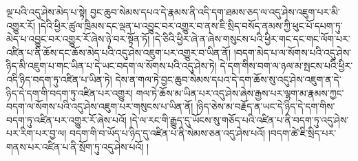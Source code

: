 ལྔ་པའི་འདུ་ཤེས་མེད་པ་སྟེ། བྱང་ཆུབ་སེམས་དཔའ་དེ་རྣམས་ནི་འདི་དག་ཐམས་ཅད་ལ་འདུ་ཤེས་འཇུག་པར་མི་འགྱུར་རོ། །དེའི་ཕྱིར་ཚུལ་ཁྲིམས་དང་ལྡན་པ་འབྱུང་བར་འགྱུར་བ་ནས་ཇི་སྲིད་བསོད་ནམས་ཀྱི་ཕུང་པོ་དཔག་ཏུ་མེད་པ་འབྱུང་བར་འགྱུར་རོ་ཞེས་ཉེ་བར་སྟོན་ཏོ། །དེ་ཅིའི་ཕྱིར་ཞེ་ན་ཞེས་གསུངས་པའི་ཕྱིར་གང་དང་གང་ལོག་པར་འཛིན་པ་ནི་ཆོས་དང་ཆོས་མེད་པའི་འདུ་ཤེས་འཇུག་པར་འགྱུར་བ་ཡིན་ནོ། །བདག་མེད་པ་ལ་སོགས་པའི་འདུ་ཤེས་ཉིད་མི་འཇུག་པ་གང་ཡིན་པ་དེ་ཡང་བདག་ལ་སོགས་པའི་འདུ་ཤེས་ཏེ། དེ་དག་གིས་བག་ལ་ཉལ་མ་སྤངས་པའི་ཕྱིར་འདི་ཉིད་བདག་ཏུ་འཛིན་པ་ཡིན་ཏེ། དེས་ན་གལ་ཏེ་བྱང་ཆུབ་སེམས་དཔའ་དེ་དག་ཆོས་སུ་འདུ་ཤེས་འཇུག་ན་དེ་ཉིད་དེ་དག་གི་བདག་ཏུ་འཛིན་པར་འགྱུར། གལ་ཏེ་ཆོས་མ་ཡིན་པར་འདུ་ཤེས་ཞེས་རྒྱས་པར་ལྷག་མ་རྣམས་ཀྱང་བདག་ལ་སོགས་པའི་འདུ་ཤེས་འཇུག་པར་གསུངས་པ་ཡིན་ནོ། །ཉིད་ཅེས་མ་བརྗོད་ན་ཡང་དེ་ཉིད་དེ་དག་གིས་བདག་ཏུ་འཛིན་པར་འགྱུར་རོ་ཞེས་པའོ། །དེ་ལ་རང་གི་རྒྱུད་དུ་ཡོངས་སུ་གཅོད་པའི་འཛིན་པ་ནི་བདག་ཏུ་འདུ་ཤེས་པར་རིག་པར་བྱ་ལ། བདག་གི་བ་ཡོད་པ་ཉིད་དུ་འཛིན་པ་ནི་སེམས་ཅན་འདུ་ཤེས་པའོ། །བདག་ཚེ་ཇི་སྲིད་པར་གནས་པར་འཛིན་པ་ནི་སྲོག་ཏུ་འདུ་ཤེས་པའོ། །
